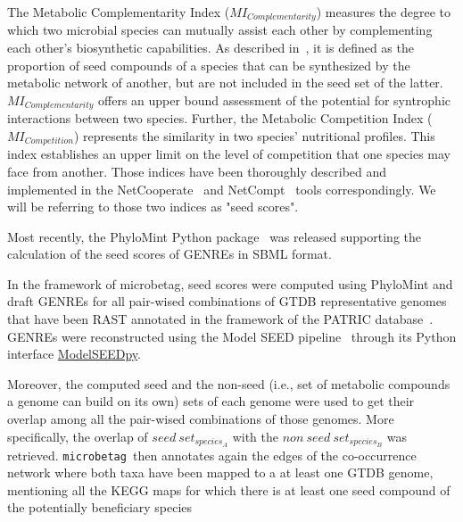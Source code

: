 \documentclass[sn-mathphys,Numbered, lineno]{sn-jnl}  %
\theoremstyle{thmstyleone}%
\theoremstyle{thmstyletwo}%
\theoremstyle{thmstylethree}%
\newcommand{\microbetag}{\texttt{microbetag }}
\begin{document}
        
        The Metabolic Complementarity Index ($MI_{Complementarity}$) measures the degree to which two microbial species can mutually assist each other by complementing each other's biosynthetic capabilities.
        As described in~\cite{phylomint_ms}, it is defined as the proportion of seed compounds of a species that can be synthesized by the metabolic network of another, but are not included in the seed set of the latter. 
        $MI_{Complementarity}$ offers an upper bound assessment of the potential for syntrophic interactions between two species.
        Further, the Metabolic Competition Index ($MI_{Competition}$) represents the similarity in two species' nutritional profiles. 
        This index establishes an upper limit on the level of competition that one species may face from another.
        Those indices have been thoroughly described and implemented in the NetCooperate~\cite{levy2015netcooperate} and NetCompt~\cite{kreimer2012netcmpt} tools correspondingly.
        We will be referring to those two indices as "seed scores".


        Most recently, the PhyloMint Python package~\cite{phylomint_ms} was released supporting the calculation of the seed scores of GENREs in SBML format.

        In the framework of microbetag, seed scores were computed using PhyloMint and draft GENREs for all pair-wised combinations of GTDB representative genomes that have been RAST annotated in the framework of the PATRIC database~\cite{wattam2017improvements}.
        GENREs were reconstructed using the Model SEED pipeline~\cite{henry2010high} through its Python interface \href{https://modelseedpy.readthedocs.io/en/latest/index.html}{ModelSEEDpy}.

        




        Moreover, the computed seed and the non-seed (i.e., set of metabolic compounds a genome can build on its own) sets of each genome were used to get their overlap among all the pair-wised combinations of those genomes.
        More specifically, the overlap of ${seed\ set}_{species_A}$ with the ${non\ seed\ set}_{species_B}$ was retrieved.
        \microbetag then annotates again the edges of the co-occurrence network where both taxa have been mapped to a at least one GTDB genome, mentioning all the KEGG maps for which there is at least one seed compound of the potentially beneficiary species 
\end{document}
